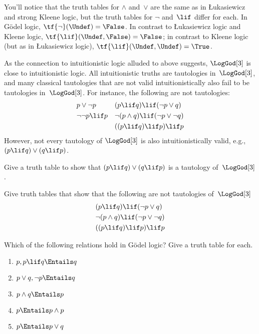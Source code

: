 \documentclass[../../../include/open-logic-section]{subfiles}
\begin{document}
You'll notice that the truth tables for $\land$ and~$\lor$ are the
same as in \L ukasiewicz and strong Kleene logic, but the truth tables
for $\lnot$ and~$\lif$ differ for each. In G\"odel logic,
$\tf{\lnot}(\Undef) = \False$. In contrast to \L ukasiewicz logic and
Kleene logic, $\tf{\lif}(\Undef, \False) = \False$; in contrast to
Kleene logic (but as in \L ukasiewicz logic), $\tf{\lif}(\Undef,
\Undef) = \True$.

As the connection to intuitionistic logic alluded to above suggests,
$\LogGod[3]$ is close to intuitionistic logic. All intuitionistic
truths are tautologies in~$\LogGod[3]$, and many classical tautologies
that are not valid intuitionistically also fail to be tautologies
in~$\LogGod[3]$. For instance, the following are not tautologies:
\begin{align*}
  & p \lor \lnot p && (p \lif q) \lif (\lnot p \lor q) \\
  & \lnot\lnot p \lif p && \lnot(p \land q) \lif (\lnot p \lor \lnot q) \\
  &&& ((p \lif q) \lif p) \lif p
\end{align*}
However, not every tautology of $\LogGod[3]$ is also intuitionistically
valid, e.g., $(p \lif q) \lor (q \lif p)$.

\begin{prob}
  Give a truth table to show that $(p \lif q) \lor (q \lif p)$ is a
  tautology of~$\LogGod[3]$.
\end{prob}

\begin{prob}
  Give truth tables that show that the following are not tautologies
  of~$\LogGod[3]$
  \begin{align*}
    & (p \lif q) \lif (\lnot p \lor q) \\
    & \lnot(p \land q) \lif (\lnot p \lor \lnot q) \\
    & ((p \lif q) \lif p) \lif p
  \end{align*}
\end{prob}

\begin{prob}
  Which of the following relations hold in G\"odel logic? Give a truth table for each.
  \begin{enumerate}
    \item $p, p \lif q \Entails q$
    \item $p \lor q, \lnot p \Entails q$
    \item $p \land q \Entails p$
    \item $p \Entails p \land p$
    \item $p \Entails p \lor q$
  \end{enumerate}
\end{prob}
\end{document}
